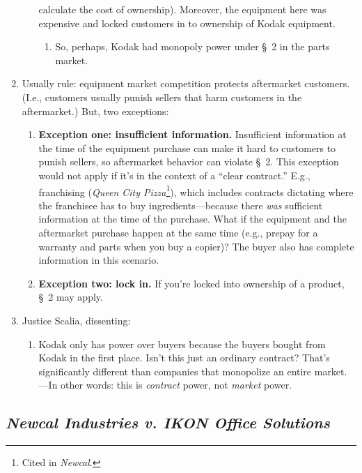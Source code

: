 \begin{enumerate}
\begin{enumerate}
        calculate the cost of ownership). Moreover, the equipment here was 
        expensive and locked customers in to ownership of Kodak equipment.
        \begin{enumerate}
            \item So, perhaps, Kodak had monopoly power under \S\ 2 in 
            the parts market.
        \end{enumerate}
    \end{enumerate}
    \item Usually rule: equipment market competition protects aftermarket 
    customers. (I.e., customers usually punish sellers that harm customers in 
    the aftermarket.) But, two exceptions: 
    \begin{enumerate}
        \item \textbf{Exception one: insufficient information.} Insufficient 
        information at the time of the equipment purchase can make it hard to 
        customers to punish sellers, so aftermarket behavior can violate \S\ 
        2. This exception would not apply if it's in the context of a ``clear 
        contract.'' E.g., franchising (\emph{Queen City Pizza}\footnote{Cited 
        in \emph{Newcal}.}), which includes contracts dictating where the 
        franchisee has to buy ingredients---because there \emph{was} 
        sufficient information at the time of the purchase. What if the 
        equipment and the aftermarket purchase happen at the same time (e.g., 
        prepay for a warranty and parts when you buy a copier)? The buyer also 
        has complete information in this scenario.
        \item \textbf{Exception two: lock in.} If you're locked into ownership 
        of a product, \S\ 2 may apply.
    \end{enumerate}
    \item Justice Scalia, dissenting:
    \begin{enumerate}
        \item Kodak only has power over buyers because the buyers bought from 
        Kodak in the first place. Isn't this just an ordinary contract? That's 
        significantly different than companies that monopolize an entire 
        market.---In other words: this is \emph{contract} power, not 
        \emph{market} power.
    \end{enumerate}
\end{enumerate}

\subsection{\emph{Newcal Industries v. IKON Office Solutions}}

